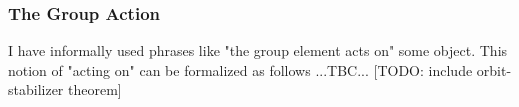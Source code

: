 




\subsubsection{The Group Action} I have informally used phrases like "the group element acts on" some object. This notion of "acting on" can be formalized as follows ...TBC... [TODO:  include orbit-stabilizer theorem]

%
%
%
%
%


